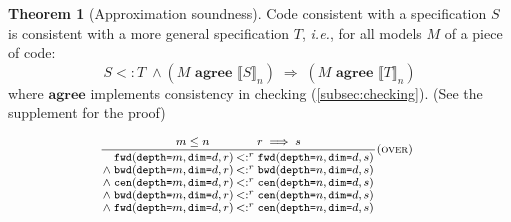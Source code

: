 \documentclass[10pt,preprint,numbers]{sigplanconf}
\newcounter{block}
\theoremstyle{definition}
\newtheorem{theorem}[block]{Theorem}
\newcommand{\ie}{\emph{i.e.}}
\newcommand{\interp}[1]{\llbracket{#1}\rrbracket}
\newcommand{\term}[1]{\texttt{#1}}
\newcommand{\stenFwdSR}[3]{\term{fwd} (\term{depth=}#1,
  \term{dim=}#2, #3)}
\newcommand{\stenBwdSR}[3]{\term{bwd} (\term{depth=}#1,
  \term{dim=}#2, #3)}
\newcommand{\stenCenSR}[3]{\term{cen} (\term{depth=}#1,
  \term{dim=}#2, #3)}
\newcommand{\trule}[1]{{\footnotesize{(\text{#1})}}}
\newcommand{\consAName}{\textbf{agree}}
\newcommand{\consA}[2]{#1 \,\, \consAName{} \,\, #2}
\begin{document}
\begin{theorem}[Approximation soundness]
Code consistent with a specification $S$
 is consistent with a more general specification $T$,
\ie{}, for all models $M$ of a piece of code:
\begin{equation*}
S <: T \; \wedge (\consA{M}{\interp{S}_n}) \;
\Rightarrow \; (\consA{M}{\interp{T}_n})
\end{equation*}
where $\consAName$ implements consistency in checking (\cref{subsec:checking}).
(See the supplement for the proof)
\end{theorem}


\begin{figure}[t]
\vspace{-0.5em}
\begin{align*}
\hspace{-0.5em}
{\small{
\begin{array}{c}
%
\vspace{-0.4em}
\setlength{\arraycolsep}{0.1em}
\dfrac{\hspace{3em} m \leq n \qquad\qquad r \implies s \hspace{3em}}
{\begin{array}{rl}
\stenFwdSR{m}{d}{r} & <:^r \stenFwdSR{n}{d}{s}
\\
\wedge \; \stenBwdSR{m}{d}{r} & <:^r \stenBwdSR{n}{d}{s}
\\
\wedge \; \stenCenSR{m}{d}{r} & <:^r \stenCenSR{n}{d}{s}
\\
\wedge \; \stenBwdSR{m}{d}{r} & <:^r \stenCenSR{n}{d}{s} \\
\wedge \; \stenFwdSR{m}{d}{r} & <:^r \stenCenSR{n}{d}{s} \\[1.2em]
\end{array}}\trule{\textsc{over}} \\[-0.2em]

\end{array}}}
\end{align*}
\end{figure}
\end{document}
